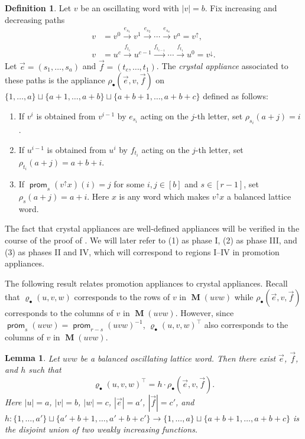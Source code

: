 \documentclass{amsart}
\newtheorem{lemma}[theorem]{Lemma}
\theoremstyle{definition}
\newtheorem{definition}[theorem]{Definition}
\theoremstyle{remark}
\numberwithin{equation}{section}
\DeclareMathOperator{\prom}{\mathsf{prom}}
\DeclareMathOperator{\PM}{\mathbf{M}}
\begin{document}
\begin{definition}\label{def:crystal-appliances}
  Let $v$ be an oscillating word with $|v| = b$. Fix increasing and decreasing paths
  \begin{align*}
    v &= v^0 \xrightarrow{e_{s_1}} v^1 \xrightarrow{e_{s_2}} \cdots \xrightarrow{e_{s_a}} v^a = v^{\uparrow}, \\
    v &= u^c \xrightarrow{f_{t_c}} u^{c-1} \xrightarrow{f_{t_{c-1}}} \cdots \xrightarrow{f_{t_1}} u^0 = v^{\downarrow}.
  \end{align*}
  Let $\vec{e} = (s_1, \ldots, s_a)$ and $\vec{f} = (t_c, \ldots, t_1)$. The \emph{crystal appliance} associated to these paths is the appliance $\rho_\bullet(\vec{e}, v, \vec{f})$ on $\{1, \ldots, a\} \sqcup \{a+1, \ldots, a+b\} \sqcup \{a+b+1, \ldots, a+b+c\}$ defined as follows:
  \begin{enumerate}[(1)]
    \item If $v^i$ is obtained from $v^{i-1}$ by $e_{s_i}$ acting on the $j$-th letter, set $\rho_{s_i}(a+j) = i$. 
    \item If $u^{i-1}$ is obtained from $u^i$ by $f_{t_i}$ acting on the $j$-th letter, set $\rho_{t_i}(a+j) = a+b+i$.
    \item If $\prom_{s}(v^{\uparrow}x)(i) = j$ for some $i,j \in [b]$ and $s \in [r-1]$, set $\rho_s(a+j) = a+i$. Here $x$ is any word which makes $v^\uparrow x$ a balanced lattice word.
  \end{enumerate}
\end{definition}

The fact that crystal appliances are well-defined appliances will be verified in the course of the proof of . We will later refer to (1) as phase I, (2) as phase III, and (3) as phases II and IV, which will correspond to regions I--IV in promotion appliances.

The following result relates promotion appliances to crystal appliances. Recall that $\varrho_\bullet(u, v, w)$ corresponds to the rows of $v$ in $\PM(uvw)$ while $\rho_\bullet(\vec{e}, v, \vec{f})$ corresponds to the columns of $v$ in $\PM(uvw)$. However, since $\prom_s(uvw) = \prom_{r-s}(uvw)^{-1}$, $\varrho_\bullet(u, v, w)^\top$ also corresponds to the columns of $v$ in $\PM(uvw)$.

\begin{lemma}\label{lem:crystal-phases}
  Let $uvw$ be a balanced oscillating lattice word. Then there exist $\vec{e}$, $\vec{f}$, and $h$ such that
  \begin{equation}\label{eq:crystal-phases}
    \varrho_\bullet(u, v, w)^\top = h \cdot \rho_\bullet(\vec{e}, v, \vec{f}).  
  \end{equation}
  Here $|u|=a$, $|v|=b$, $|w|=c$, $|\vec{e}|=a'$, $|\vec{f}| =c'$, and $h \colon \{1, \ldots, a'\} \sqcup \{a'+b+1, \ldots, a'+b+c'\} \to \{1, \ldots, a\} \sqcup \{a+b+1, \ldots, a+b+c\}$ is the disjoint union of two weakly increasing functions.
\end{lemma}
\end{document}
